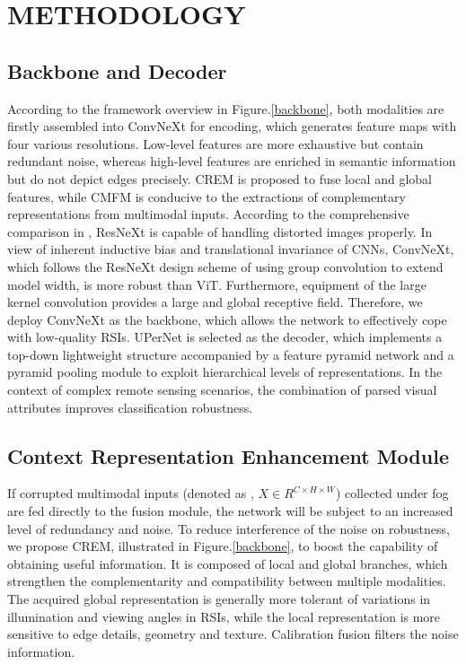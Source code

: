 \documentclass[lettersize,journal]{IEEEtran}
\begin{document}
\section{METHODOLOGY}
\subsection{Backbone and Decoder}
According to the framework overview in Figure.\ref{backbone}, both modalities are firstly assembled into ConvNeXt for encoding, which generates feature maps with four various resolutions. Low-level features are more exhaustive but contain redundant noise, whereas high-level features are enriched in semantic information but do not depict edges precisely. CREM is proposed to fuse local and global features, while CMFM is conducive to the extractions of complementary representations  from multimodal inputs. According to the comprehensive comparison in \cite{tangRobustARTBenchmarkingRobustness2021}, ResNeXt is capable of handling distorted images properly. In view of inherent inductive bias and translational invariance of CNNs, ConvNeXt, which follows the ResNeXt design scheme of using group convolution to extend model width, is more robust than ViT. Furthermore, equipment of the large kernel convolution provides a large and global receptive field. Therefore, we deploy ConvNeXt as the backbone, which allows the network to effectively cope with low-quality RSIs. UPerNet is selected as the decoder, which implements a top-down lightweight structure accompanied by a feature pyramid network and a pyramid pooling module to exploit hierarchical levels of representations. In the context of complex remote sensing scenarios, the combination of parsed visual attributes improves classification robustness.


\subsection{Context Representation Enhancement Module}
If corrupted multimodal inputs (denoted as , $X\in R^{C\times H \times W}$) collected under fog are fed directly to the fusion module, the network will be subject to an increased level of redundancy and noise. To reduce interference of the noise on robustness, we propose CREM, illustrated in Figure.\ref{backbone}, to boost the capability of obtaining useful information. It is composed of local and global branches, which strengthen the complementarity and compatibility between multiple modalities. The acquired global representation is generally more tolerant of variations in illumination and viewing angles in RSIs, while the local representation is more sensitive to edge details, geometry and texture. Calibration fusion filters the noise information. 
\end{document}
